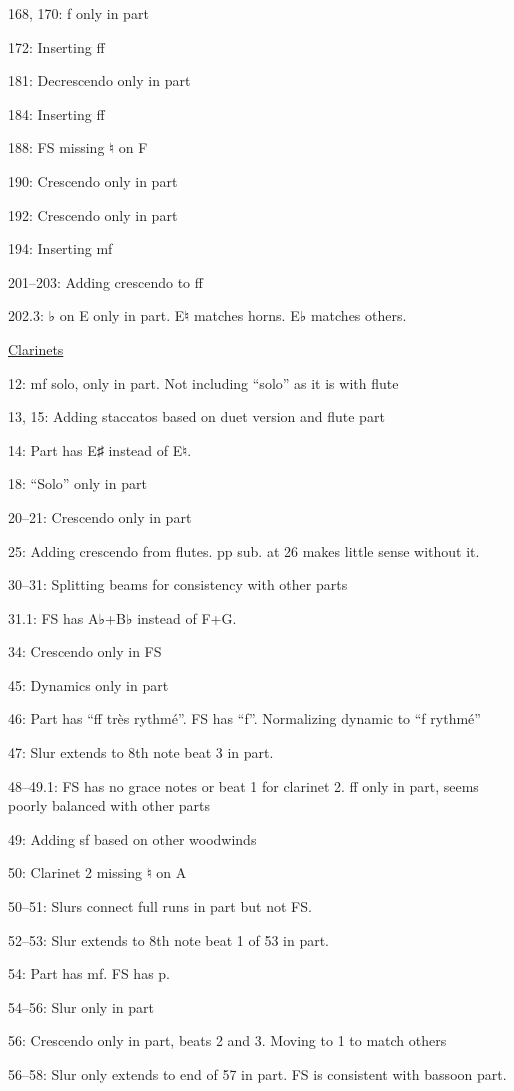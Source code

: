 \documentclass[twoside]{article}
\begin{document}
\begin{hangparas}{15pt}{1}
\begin{multicols}{2}
168, 170: f only in part

172: Inserting ff

181: Decrescendo only in part

184: Inserting ff

188: FS missing ♮ on F

190: Crescendo only in part

192: Crescendo only in part

194: Inserting mf

201--203: Adding crescendo to ff

202.3: ♭ on E only in part. E♮ matches horns. E♭ matches others.

\underline{Clarinets}

12: mf solo, only in part. Not including ``solo'' as it is with flute

13, 15: Adding staccatos based on duet version and flute part

14: Part has E♯ instead of E♮.

18: ``Solo'' only in part

20--21: Crescendo only in part

25: Adding crescendo from flutes. pp sub. at 26 makes little sense without it.

30--31: Splitting beams for consistency with other parts

31.1: FS has A♭+B♭ instead of F+G.

34: Crescendo only in FS

45: Dynamics only in part

46: Part has ``ff très rythmé''. FS has ``f''. Normalizing dynamic to ``f rythmé''

47: Slur extends to 8th note beat 3 in part.

48--49.1: FS has no grace notes or beat 1 for clarinet 2. ff only in part, seems poorly balanced with other parts

49: Adding sf based on other woodwinds

50: Clarinet 2 missing ♮ on A

50--51: Slurs connect full runs in part but not FS.

52--53: Slur extends to 8th note beat 1 of 53 in part.

54: Part has mf. FS has p.

54--56: Slur only in part

56: Crescendo only in part, beats 2 and 3. Moving to 1 to match others

56--58: Slur only extends to end of 57 in part. FS is consistent with bassoon part.


\end{multicols}
\end{hangparas}
\end{document}
